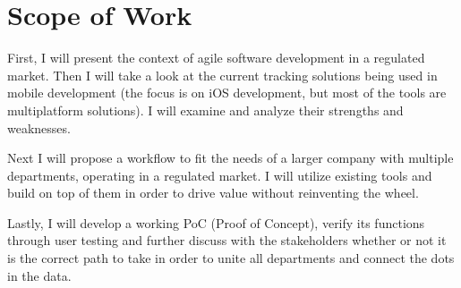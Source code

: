 \section{Scope of Work}

First, I will present the context of agile software development in a regulated market. Then I will take a look at the current tracking solutions being used in mobile development (the focus is on iOS development, but most of the tools are multiplatform solutions). I will examine and analyze their strengths and weaknesses. 

Next I will propose a workflow to fit the needs of a larger company with multiple departments, operating in a regulated market. I will utilize existing tools and build on top of them in order to drive value without reinventing the wheel.

Lastly, I will develop a working PoC (Proof of Concept), verify its functions through user testing and further discuss with the stakeholders whether or not it is the correct path to take in order to unite all departments and connect the dots in the data.
